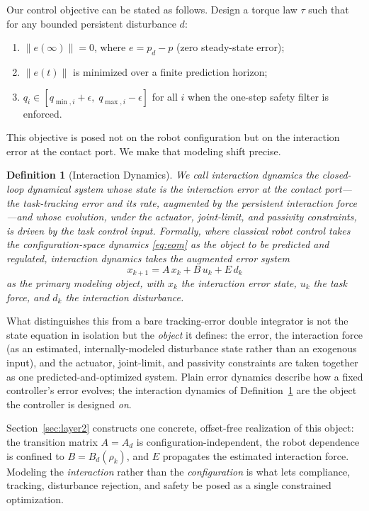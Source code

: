 \documentclass[journal]{IEEEtran}
\newtheorem{definition}{Definition}
\begin{document}
Our control objective can be stated as follows. 
Design a torque law $\tau$ such that for any bounded persistent
disturbance $d$:
\begin{enumerate}
  \item $\|e(\infty)\|=0$, where $e=p_d-p$ (zero steady-state error);
  \item $\|e(t)\|$ is minimized over a finite prediction horizon;
  \item $q_i\in[q_{\min,i}+\epsilon,\;q_{\max,i}-\epsilon]$
        for all $i$ when the one-step safety filter is enforced.
\end{enumerate}

This objective is posed not on the robot configuration but on the interaction
error at the contact port. We make that modeling shift precise.

\begin{definition}[Interaction Dynamics]\label{def:id}
We call \emph{interaction dynamics} the closed-loop dynamical system whose
state is the interaction error at the contact port---the task-tracking error
and its rate, augmented by the persistent interaction force---and whose
evolution, under the actuator, joint-limit, and passivity constraints, is
driven by the task control input. Formally, where classical robot control takes
the configuration-space dynamics \eqref{eq:eom} as the object to be predicted and regulated,
interaction dynamics takes the augmented error system
\[
  x_{k+1} = A\,x_k + B\,u_k + E\,d_k
\]
as the primary modeling object, with $x_k$ the interaction error state, $u_k$
the task force, and $d_k$ the interaction disturbance.
\end{definition}

What distinguishes this from a bare tracking-error double integrator is not the
state equation in isolation but the \emph{object} it defines: the error, the
interaction force (as an estimated, internally-modeled disturbance state rather
than an exogenous input), and the actuator, joint-limit, and passivity
constraints are taken together as one predicted-and-optimized system. Plain
error dynamics describe how a fixed controller's error evolves; the interaction
dynamics of Definition~\ref{def:id} are the object the controller is designed
\emph{on}.

Section~\ref{sec:layer2} constructs one concrete, offset-free realization of
this object: the transition matrix $A=A_d$ is configuration-independent, the
robot dependence is confined to $B=B_d(\rho_k)$, and $E$ propagates the
estimated interaction force. Modeling the \emph{interaction} rather than the
\emph{configuration} is what lets compliance, tracking, disturbance rejection,
and safety be posed as a single constrained optimization.
\end{document}
